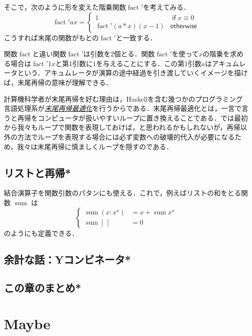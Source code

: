 \documentclass[a4paper]{jsbook}
\newcommand{\programminglanguage}[1]{\textsf{#1}}
\newcommand{\haskell}{\programminglanguage{Haskell}}
\newcommand{\keyword}[1]{{\underline{\emph{#1}}}}
\newcommand{\mEmptyList}{{[\,]}}
\newcommand{\mList}[1]{{#1}^\mathrm{\star}}
\DeclareMathOperator{\mSum}{sum}
\DeclareMathOperator{\mathFactorial}{fact}
\newcommand{\mathKeyword}[1]{\operatorname{\textsf{#1}}}
\newcommand{\mathIf}{\mathKeyword{if}}
\newcommand{\mathOtherwise}{\mathKeyword{otherwise}}
\begin{document}
そこで，次のように形を変えた階乗関数$\mathFactorial'$を考えてみる．
\begin{equation}
\mathFactorial'ax=\begin{cases}
1&\mathIf x\equiv0\\
\mathFactorial'(a*x)(x-1)&\mathOtherwise
\end{cases}
\end{equation}
こうすれば末尾の関数がもとの$\mathFactorial'$と一致する．

関数$\mathFactorial$と違い関数$\mathFactorial'$は引数を2個とる．関数$\mathFactorial'$を使って$x$の階乗を求める場合は$\mathFactorial'1x$と第1引数に$1$を与えることにする．この第1引数$a$はアキュムレータという．アキュムレータが演算の途中経過を引き渡していくイメージを描けば，末尾再帰の意味が理解できる．

計算機科学者が末尾再帰を好む理由は，\haskell を含む幾つかのプログラミング言語処理系が\keyword{末尾再帰最適化}を行うからである．末尾再帰最適化とは，一言で言うと再帰をコンピュータが扱いやすいループに置き換えることである．では最初から我々もループで関数を表現しておけば，と思われるかもしれないが，再帰以外の方法でループを表現する場合には必ず変数への破壊的代入が必要になるため，我々は末尾再帰に慎ましくループを隠すのである．

\section{リストと再帰*}

結合演算子を関数引数のパタンにも使える．これで，例えばリストの和をとる関数 $\mSum$ は
\begin{equation}
\left\{
\begin{split}
\mSum(x:\mList{x})&=x+\mSum\mList{x}\\
\mSum\mEmptyList&=0
\end{split}
\right.
\end{equation}
のようにも定義できる．

\section{余計な話：Yコンビネータ*}

\section{この章のまとめ*}


\chapter{Maybe}
\end{document}
